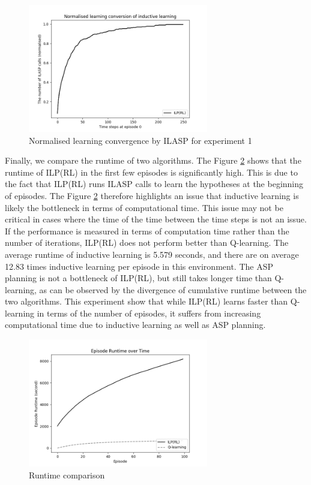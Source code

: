 \begin{figure}[!htb]
\centering
\includegraphics[width=0.7\textwidth]{./figures/experiment1_ilasp}
\caption{Normalised learning convergence by ILASP for experiment 1}
\label{experiment1_ilasp}
\end{figure}

Finally, we compare the runtime of two algorithms. 
The Figure \ref{exp1_runtime} shows that the runtime of ILP(RL) in the first few episodes is significantly high. 
This is due to the fact that ILP(RL) runs ILASP calls to learn the hypotheses at the beginning of episodes.
The Figure \ref{exp1_runtime} therefore highlights an issue that inductive learning is likely the bottleneck in terms of computational time.
This issue may not be critical in cases where the time of the time between the time steps is not an issue. If the performance is measured in terms of computation time rather than the number of iterations, 
ILP(RL) does not perform better than Q-learning. 
The average runtime of inductive learning is 5.579 seconds, and there are on average 12.83 times inductive learning per episode in this environment.
The ASP planning is not a bottleneck of ILP(RL), but still takes longer time than Q-learning, as can be observed by the divergence of cumulative runtime between the two algorithms. 
This experiment show that while ILP(RL) learns faster than Q-learning in terms of the number of episodes, it suffers from increasing computational time due to inductive learning as well as ASP planning.

\begin{figure}[!htb]
\centering
\includegraphics[width=0.7\textwidth]{./figures/experiment1_runtime}
\caption{Runtime comparison}
\label{exp1_runtime}
\end{figure}

